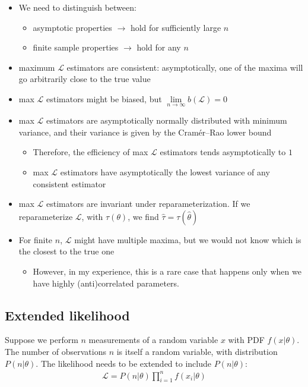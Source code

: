 \begin{itemize}[$\to$]
    \item We need to distinguish between: 
\begin{itemize}[$\to$]
    \item asymptotic properties $\rightarrow$ hold for sufficiently large $n$
    \item finite sample properties $\rightarrow$ hold for any $n$
\end{itemize}
    \item maximum $\mathcal{L}$ estimators are consistent: asymptotically, one of the maxima will go arbitrarily close to the true value 
    \item max $\mathcal{L}$ estimators might be biased, but $\lim \limits_{n \to \infty} b(\mathcal{L})=0$
    \item max $\mathcal{L}$ estimators are asymptotically normally distributed with minimum variance, and their variance is given by the Cramér–Rao lower bound
    \begin{itemize}[$\to$]
        \item Therefore, the efficiency of max $\mathcal{L}$ estimators tends asymptotically to $1$
        \item max $\mathcal{L}$ estimators have asymptotically the lowest variance of any consistent estimator
    \end{itemize}
    \item max $\mathcal{L}$ estimators are invariant under reparameterization. If we reparameterize $\mathcal{L}$, with $\tau(\theta)$, we find $\hat{\tau}=\tau(\hat{\theta})$
    \item For finite $n$, $\mathcal{L}$ might have multiple maxima, but we would not know which is the closest to the true one
    \begin{itemize}[$\to$]
        \item However, in my experience, this is a rare case that happens only when we have highly (anti)correlated parameters.
    \end{itemize}
\end{itemize}

\subsection{Extended likelihood} 
\label{subsec:point_estimation_ext_likelihood}
Suppose we perform $n$ measurements of a random variable $x$ with PDF $f(x|\theta)$. The number of observations $n$ is itself a random variable, with distribution $P(n|\theta)$.
The likelihood needs to be extended to include $P(n|\theta)$: 
\begin{align}
    \mathcal{L} = P(n|\theta) \prod \limits_{i=1}^{n} f(x_i|\theta)
\end{align}

